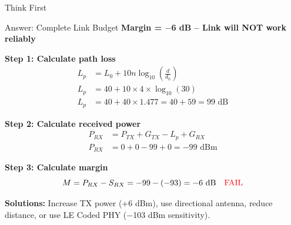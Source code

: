 \documentclass[aspectratio=169,11pt]{beamer}
\begin{document}
\begin{frame}{Think First}
    \begin{center}
    \end{center}
\end{frame}

\begin{frame}{Answer: Complete Link Budget}
    \textbf{Margin = $-$6 dB -- Link will NOT work reliably}
    
    \vspace{0.3cm}
    \textbf{Step 1: Calculate path loss}
    \begin{align*}
        L_p &= L_0 + 10n\log_{10}\left(\frac{d}{d_0}\right) \\
        L_p &= 40 + 10 \times 4 \times \log_{10}(30) \\
        L_p &= 40 + 40 \times 1.477 = 40 + 59 = 99 \text{ dB}
    \end{align*}
    
    \textbf{Step 2: Calculate received power}
    \begin{align*}
        P_{RX} &= P_{TX} + G_{TX} - L_p + G_{RX} \\
        P_{RX} &= 0 + 0 - 99 + 0 = -99 \text{ dBm}
    \end{align*}
    
    \textbf{Step 3: Calculate margin}
    \[
    M = P_{RX} - S_{RX} = -99 - (-93) = -6 \text{ dB} \quad \text{\textcolor{red}{FAIL}}
    \]
    
    \textbf{Solutions:} Increase TX power (+6 dBm), use directional antenna, reduce distance, or use LE Coded PHY ($-$103 dBm sensitivity).
\end{frame}
\end{document}
